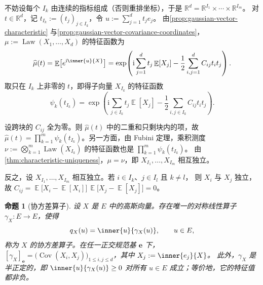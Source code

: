 \documentclass[UTF8,11pt,a4paper,oneside,fontset=fandol]{ctexrep}
\makeatletter
\numberwithin{equation}{section}
\theoremstyle{zhthm}
\newtheorem{proposition}[theorem]{命题}
\renewenvironment{proof}[1][\proofname]{\par
  \pushQED{\qed}%
  \normalfont\topsep6\p@\@plus6\p@\relax
  \trivlist
  \item[\hskip\labelsep\bfseries#1\hspace{0.5em}]\ignorespaces
}{%
  \popQED\endtrivlist\@endpefalse
}
\renewcommand{\proofname}{证明}
\newcommand{\R}{\mathbb{R}}
\DeclareMathOperator{\E}{\mathbb{E}}
\DeclareMathOperator{\Cov}{Cov}
\DeclareMathOperator{\Law}{Law}
\newcommand{\iu}{\mathrm{i}}
\makeatother
\begin{document}
\begin{proof}
不妨设每个 $I_k$ 由连续的指标组成（否则重排坐标），于是 $\R^d=\R^{I_1}\times\cdots\times\R^{I_m}$。
对 $t\in\R^d$，记 $t_{I_k}:=(t_j)_{j\in I_k}$，令 $u:=\sum_{j=1}^{d}t_je_j$。
由\cref{prop:gaussian-vector-characteristic} 与\cref{prop:gaussian-vector-covariance-coordinates}，
$\mu:=\Law(X_1,\ldots,X_d)$ 的特征函数为
\[
  \widehat\mu(t)=\E\bigl[e^{\iu\inner{u}{X}}\bigr]
  =\exp\!\left(\iu\sum_{j=1}^{d}t_j\E[X_j]-\frac12\sum_{i,j=1}^{d}C_{ij}t_it_j\right).
\]
取只在 $I_k$ 上非零的 $t$，即得子向量 $X_{I_k}$ 的特征函数
\[
  \psi_k(t_{I_k})=\exp\!\left(\iu\sum_{j\in I_k}t_j\E[X_j]-\frac12\sum_{i,j\in I_k}C_{ij}t_it_j\right).
\]

设跨块的 $C_{ij}$ 全为零。则 $\widehat\mu(t)$ 中的二重和只剩块内的项，故
$\widehat\mu(t)=\prod_{k=1}^{m}\psi_k(t_{I_k})$。另一方面，由 Fubini 定理，乘积测度
$\nu:=\bigotimes_{k=1}^{m}\Law(X_{I_k})$ 的特征函数也是 $\prod_{k=1}^{m}\psi_k(t_{I_k})$。
由\cref{thm:characteristic-uniqueness}，$\mu=\nu$，即 $X_{I_1},\ldots,X_{I_m}$ 相互独立。

反之，设 $X_{I_1},\ldots,X_{I_m}$ 相互独立。若 $i\in I_k$、$j\in I_l$ 且 $k\ne l$，
则 $X_i$ 与 $X_j$ 独立，故 $C_{ij}=\E\bigl[X_i-\E[X_i]\bigr]\,\E\bigl[X_j-\E[X_j]\bigr]=0$。
\end{proof}

\begin{proposition}[协方差算子]
\label{prop:gaussian-covariance-operator}
设 $X$ 是 $E$ 中的高斯向量。存在唯一的对称线性算子 $\gamma_X:E\to E$，使得
\begin{equation}
  \label{eq:gaussian-covariance-operator}
  q_X(u)=\inner{u}{\gamma_X(u)},\qquad u\in E,
\end{equation}
称为 $X$ 的协方差算子。在任一正交规范基 $\mathbf e$ 下，
$[\gamma_X]_{\mathbf e}=\bigl(\Cov(X_i,X_j)\bigr)_{1\le i,j\le d}$，其中 $X_j:=\inner{e_j}{X}$。
此外，$\gamma_X$ 是半正定的，即 $\inner{u}{\gamma_X(u)}\ge0$ 对所有 $u\in E$ 成立；等价地，它的特征值都非负。
\end{proposition}
\end{document}
